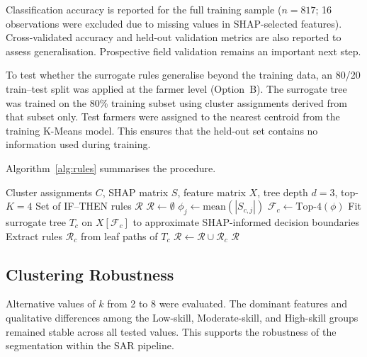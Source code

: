 \documentclass[3p,twocolumn,authoryear]{elsarticle}
\begin{document}
Classification accuracy is reported for the full training sample ($n = 817$; 16
observations were excluded due to missing values in SHAP-selected features).
Cross-validated accuracy and held-out validation metrics are also reported to
assess generalisation. Prospective field validation remains an important next
step.

To test whether the surrogate rules generalise beyond the training data, an
80/20 train--test split was applied at the farmer level (Option~B). The
surrogate tree was trained on the 80\% training subset using cluster assignments
derived from that subset only. Test farmers were assigned to the nearest
centroid from the training K-Means model. This ensures that the held-out set
contains no information used during training.

Algorithm~\ref{alg:rules} summarises the procedure.


\begin{algorithm}
\caption{SHAP-guided Surrogate Rule Extraction}
\label{alg:rules}
\begin{algorithmic}[1]
\Require Cluster assignments $C$, SHAP matrix $S$, feature matrix $X$,
         tree depth $d = 3$, top-$K = 4$
\Ensure Set of IF--THEN rules $\mathcal{R}$
\State $\mathcal{R} \gets \emptyset$
  \State $\phi_j \gets \text{mean}(|S_{c,j}|)$
  \State $\mathcal{F}_c \gets \text{Top-}4(\phi)$
  \State Fit surrogate tree $T_c$ on $X[\mathcal{F}_c]$
         to approximate SHAP-informed decision boundaries
  \State Extract rules $\mathcal{R}_c$ from leaf paths of $T_c$
  \State $\mathcal{R} \gets \mathcal{R} \cup \mathcal{R}_c$
\EndFor
\State \Return $\mathcal{R}$
\end{algorithmic}
\end{algorithm}

\subsection{Clustering Robustness}

Alternative values of $k$ from 2 to 8 were evaluated. The dominant features and
qualitative differences among the Low-skill, Moderate-skill, and High-skill
groups remained stable across all tested values. This supports the robustness of
the segmentation within the SAR pipeline.

\end{document}
